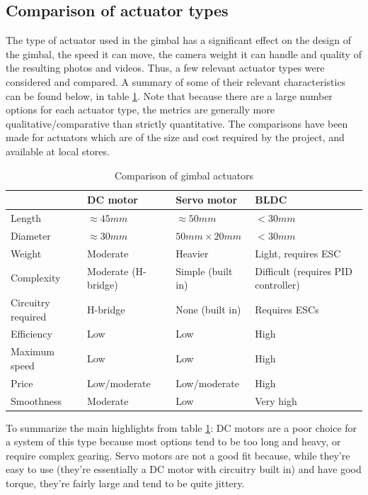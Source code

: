 \subsection{Comparison of actuator types}
The type of actuator used in the gimbal has a significant effect on the design of the gimbal, the speed it can move, the camera weight it can handle and quality of the resulting photos and videos. Thus, a few relevant actuator types were considered and compared. A summary of some of their relevant characteristics can be found below, in table \ref{table:gimbal_actuators}. Note that because there are a large number options for each actuator type, the metrics are generally more qualitative/comparative than strictly quantitative. The comparisons have been made for actuators which are of the size and cost required by the project, and available at local stores.
\newline

\begin{table}[h!]
	\centering
	\begin{tabular}{ p{2cm}||p{4cm}|p{4cm}|p{4cm} }
					& DC motor			& Servo motor		& BLDC \\
	\hline \hline
	Length			& $\approx 45mm$	& $\approx 50mm$	& $<30mm$ \\
	\hline
	Diameter		& $\approx 30mm$	& $50mm\times 20mm$	& $<30mm$ \\
	\hline
	Weight			& Moderate			& Heavier			& Light, requires ESC \\
	\hline
	Complexity		& Moderate (H-bridge) & Simple (built in) & Difficult (requires PID controller) \\
	\hline
	Circuitry required & H-bridge		& None (built in)	& Requires ESCs \\
	\hline
	Efficiency		& Low				& Low				& High \\
	\hline
	Maximum speed	& Low				& Low				& High \\
	\hline
	Price			& Low/moderate		& Low/moderate		& High \\
	\hline
	Smoothness		& Moderate			& Low				& Very high \\
	\hline
	\end{tabular}
	\caption{Comparison of gimbal actuators}
	\label{table:gimbal_actuators}
\end{table}

To summarize the main highlights from table \ref{table:gimbal_actuators}: DC motors are a poor choice for a system of this type because most options tend to be too long and heavy, or require complex gearing. Servo motors are not a good fit because, while they're easy to use (they're essentially a DC motor with circuitry built in) and have good torque, they're fairly large and tend to be quite jittery.

